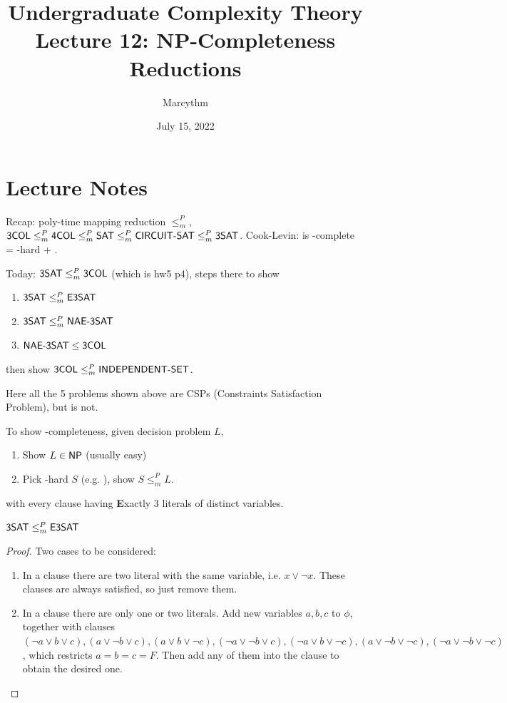 \documentclass{article}
\title{Undergraduate Complexity Theory \\ Lecture 12: NP-Completeness Reductions}
\author{Marcythm}
\date{July 15, 2022}
\begin{document}
\maketitle{}

\section{Lecture Notes}

Recap: poly-time mapping reduction \(\leq_m^P\), \( \text{\sf 3COL} \leq_m^P \text{\sf 4COL} \leq_m^P \text{\sf SAT} \leq_m^P \text{\sf CIRCUIT-SAT} \leq_m^P \text{\sf 3SAT} \). Cook-Levin:  is \NP-complete = \NP-hard + \NP.

Today: \(\text{\sf 3SAT} \leq_m^P \text{\sf 3COL}\) (which is hw5 p4), steps there to show
\begin{enumerate}
  \item \( \text{\sf 3SAT} \leq_m^P \text{\sf E3SAT} \)
  \item \( \text{\sf 3SAT} \leq_m^P \text{\sf NAE-3SAT} \)
  \item \( \text{\sf NAE-3SAT} \leq \text{\sf 3COL} \)
\end{enumerate}

then show \(\text{\sf 3COL} \leq_m^P \text{\sf INDEPENDENT-SET}\).

\begin{remark}
  Here all the 5 problems shown above are CSPs (Constraints Satisfaction Problem), but  is not.
\end{remark}

To show \NP-completeness, given decision problem \(L\),
\begin{enumerate}
  \item Show \(L \in \text{\sf NP}\) (usually easy)
  \item Pick \NP-hard \(S\) (e.g. ), show \(S \leq_m^P L\).
\end{enumerate}

\begin{definition}
   with every clause having {\bf E}xactly 3 literals of distinct variables.
\end{definition}

\begin{theorem}
  \( \text{\sf 3SAT} \leq_m^P \text{\sf E3SAT} \)
\end{theorem}

\begin{proof}
  Two cases to be considered:
  \begin{enumerate}
    \item In a clause there are two literal with the same variable, i.e. \(x \vee \neg x\). These clauses are always satisfied, so just remove them.
    \item In a clause there are only one or two literals. Add new variables \(a, b, c\) to \(\phi\), together with clauses \( (\neg a \vee b \vee c), (a \vee \neg b \vee c), (a \vee b \vee \neg c), (\neg a \vee \neg b \vee c), (\neg a \vee b \vee \neg c), (a \vee \neg b \vee \neg c), (\neg a \vee \neg b \vee \neg c) \), which restricts \(a = b = c = F\). Then add any of them into the clause to obtain the desired one.
  \end{enumerate}
\end{proof}
\end{document}
